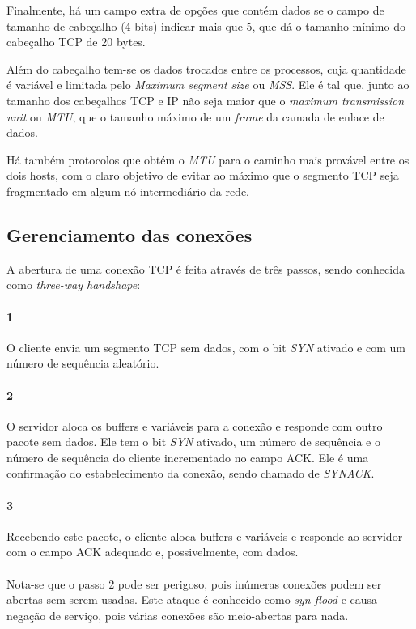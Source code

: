 Finalmente, há um campo extra de opções que contém dados se o campo de tamanho de cabeçalho (4 bits) indicar mais que 5, 
que dá o tamanho mínimo do cabeçalho TCP de 20 bytes.

Além do cabeçalho tem-se os dados trocados entre os processos, cuja quantidade é variável e limitada pelo \emph{Maximum segment size} ou \emph{MSS}.
Ele é tal que, junto ao tamanho dos cabeçalhos TCP e IP não seja maior que o \emph{maximum transmission unit} ou \emph{MTU},
que o tamanho máximo de um \emph{frame} da camada de enlace de dados.

Há também protocolos que obtém o \emph{MTU} para o caminho mais provável entre os dois hosts, com o claro objetivo de evitar ao máximo que o segmento TCP seja fragmentado em algum nó intermediário da rede.

\subsection{Gerenciamento das conexões}

A abertura de uma conexão TCP é feita através de três passos, sendo conhecida como \emph{three-way handshape}:
\paragraph{1} O cliente envia um segmento TCP sem dados, com o bit \emph{SYN} ativado e com um número de sequência aleatório.
\paragraph{2} O servidor aloca os buffers e variáveis para a conexão e responde com outro pacote sem dados. 
Ele tem o bit \emph{SYN} ativado, um número de sequência e o número de sequência do cliente incrementado no campo ACK.
Ele é uma confirmação do estabelecimento da conexão, sendo chamado de \emph{SYNACK}.
\paragraph{3} Recebendo este pacote, o cliente aloca buffers e variáveis e responde ao servidor com o campo ACK adequado e, possivelmente, com dados.
\paragraph{} 

Nota-se que o passo 2 pode ser perigoso, pois inúmeras conexões podem ser abertas sem serem usadas.
Este ataque é conhecido como \emph{syn flood} e causa negação de serviço, pois várias conexões são meio-abertas para nada.

